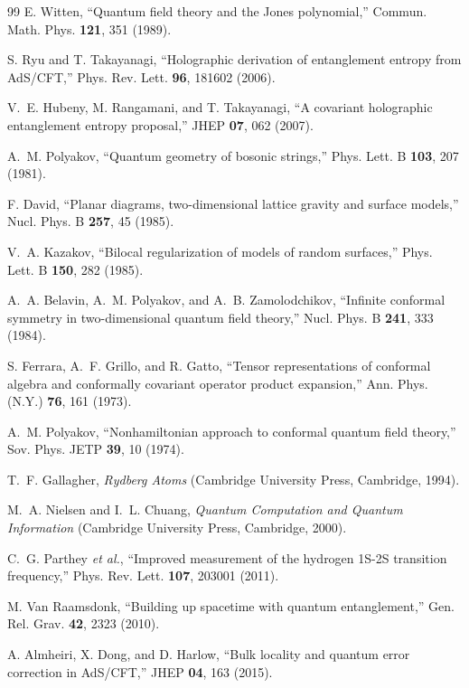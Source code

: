 \documentclass[aps,prd,twocolumn,superscriptaddress,floatfix]{revtex4-2}
\begin{document}
\begin{thebibliography}{99}
E. Witten,
``Quantum field theory and the Jones polynomial,''
Commun. Math. Phys. \textbf{121}, 351 (1989).

S. Ryu and T. Takayanagi,
``Holographic derivation of entanglement entropy from AdS/CFT,''
Phys. Rev. Lett. \textbf{96}, 181602 (2006).

V.~E. Hubeny, M. Rangamani, and T. Takayanagi,
``A covariant holographic entanglement entropy proposal,''
JHEP \textbf{07}, 062 (2007).

A.~M. Polyakov,
``Quantum geometry of bosonic strings,''
Phys. Lett. B \textbf{103}, 207 (1981).

F. David,
``Planar diagrams, two-dimensional lattice gravity and surface models,''
Nucl. Phys. B \textbf{257}, 45 (1985).

V.~A. Kazakov,
``Bilocal regularization of models of random surfaces,''
Phys. Lett. B \textbf{150}, 282 (1985).

A.~A. Belavin, A.~M. Polyakov, and A.~B. Zamolodchikov,
``Infinite conformal symmetry in two-dimensional quantum field theory,''
Nucl. Phys. B \textbf{241}, 333 (1984).

S. Ferrara, A.~F. Grillo, and R. Gatto,
``Tensor representations of conformal algebra and conformally covariant operator product expansion,''
Ann. Phys. (N.Y.) \textbf{76}, 161 (1973).

A.~M. Polyakov,
``Nonhamiltonian approach to conformal quantum field theory,''
Sov. Phys. JETP \textbf{39}, 10 (1974).

T.~F. Gallagher,
\textit{Rydberg Atoms}
(Cambridge University Press, Cambridge, 1994).

M.~A. Nielsen and I.~L. Chuang,
\textit{Quantum Computation and Quantum Information}
(Cambridge University Press, Cambridge, 2000).

C.~G. Parthey \textit{et al.},
``Improved measurement of the hydrogen 1S-2S transition frequency,''
Phys. Rev. Lett. \textbf{107}, 203001 (2011).

M. Van Raamsdonk,
``Building up spacetime with quantum entanglement,''
Gen. Rel. Grav. \textbf{42}, 2323 (2010).

A. Almheiri, X. Dong, and D. Harlow,
``Bulk locality and quantum error correction in AdS/CFT,''
JHEP \textbf{04}, 163 (2015).


\end{thebibliography}
\end{document}
